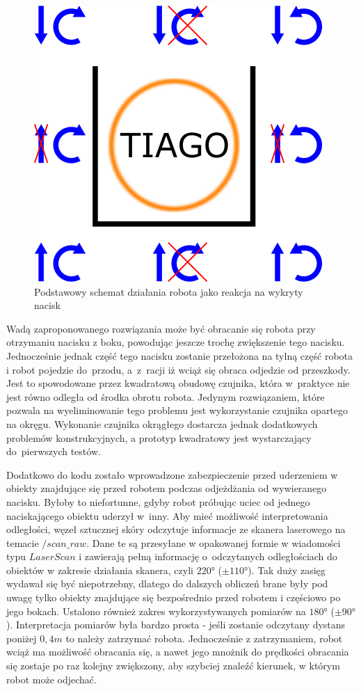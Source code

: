 \begin{figure}[!h]
    \centering 
    \includegraphics[width=0.5\linewidth]{img/kierunek_shcemat.png}
    \caption{Podstawowy schemat działania robota jako reakcja na wykryty nacisk}
    \label{f_algorytm_kierunek_schemat}
\end{figure}

Wadą zaproponowanego rozwiązania może być obracanie się robota przy otrzymaniu nacisku z boku, powodując jeszcze trochę zwiększenie tego nacisku. Jednocześnie jednak część tego nacisku zostanie przełożona na tylną część robota i robot pojedzie do~przodu, a~z~racji iż wciąż się obraca odjedzie od przeszkody. Jest to spowodowane przez kwadratową obudowę czujnika, która w~praktyce nie jest równo odległa od środka obrotu robota. Jedynym rozwiązaniem, które pozwala na wyeliminowanie tego problemu jest wykorzystanie czujnika opartego na okręgu. Wykonanie czujnika okrągłego dostarcza jednak dodatkowych problemów konstrukcyjnych, a prototyp kwadratowy jest wystarczający do~pierwszych testów.

Dodatkowo do kodu zostało wprowadzone zabezpieczenie przed uderzeniem w obiekty znajdujące się przed robotem podczas odjeżdżania od wywieranego nacisku. Byłoby to niefortunne, gdyby robot próbując uciec od jednego naciskającego obiektu uderzył w~inny. Aby mieć możliwość interpretowania odległości, węzeł sztucznej skóry odczytuje informacje ze skanera laserowego na temacie $/scan\_raw$. Dane te są przesyłane w opakowanej formie w wiadomości typu $LaserScan$ i zawierają pełną informację o~odczytanych odległościach do obiektów w zakresie działania skanera, czyli $\ang{220}$ ($\pm \ang{110}$). Tak duży zasięg wydawał się być niepotrzebny, dlatego do dalszych obliczeń brane były pod uwagę tylko obiekty znajdujące się bezpośrednio przed robotem i częściowo po jego bokach. Ustalono również zakres wykorzystywanych pomiarów na $\ang{180}$ ($\pm \ang{90}$). Interpretacja pomiarów była bardzo prosta - jeśli zostanie odczytany dystans poniżej $0,4m$ to należy zatrzymać robota. Jednocześnie z zatrzymaniem, robot wciąż ma możliwość obracania się, a nawet jego mnożnik do prędkości obracania się zostaje po raz kolejny zwiększony, aby szybciej znaleźć kierunek, w którym robot może odjechać.
